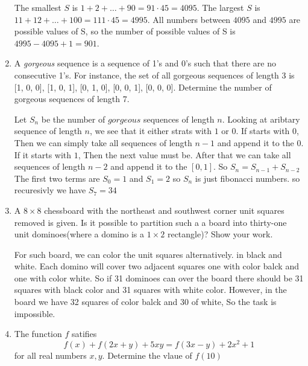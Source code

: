 \documentclass[a4paper]{article}
\theoremstyle{definition}
\begin{document}
\begin{enumerate}
\begin{tcolorbox}[width=\linewidth, sharp corners=all, colback=white!95!black]
    The smallest $S$ is $1+2+ \ldots +90 = 91 \cdot 45 = 4095$. The largest $S$
    is $11+12+ \ldots +100=111\cdot 45=4995$. All numbers between $4095$ and
    $4995$ are possible values of S, so the number of possible values of S is
    $4995-4095+1=901$.

\end{tcolorbox}




\item A \textit{gorgeous} sequence is a sequence of 1’s and 0’s such that there are no consecutive 1’s. For
instance, the set of all gorgeous sequences of length 3 is {[1, 0, 0], [1, 0, 1], [0, 1, 0], [0, 0, 1], [0, 0, 0]}.
Determine the number of gorgeous sequences of length 7.

\begin{tcolorbox}[width=\linewidth, sharp corners=all, colback=white!95!black]
    Let $S_n$ be the number of $gorgeous$ sequences of length $n$.
    Looking at aribtary sequence of length $n$, we see that
    it either strats with $1$ or $0$. If starts with $0$,
    Then we can simply take all sequences of length $n-1$ and
    append it to the $0$.
    If it starts with $1$, Then the next value must be. After
    that we can take all sequences of length $n-2$ and append it
    to the $[0, 1]$. So $S_n = S_{n-1} + S_{n-2}$
    The first two terms are $S_0 = 1$ and $S_1 = 2$
    so $S_n$ is just fibonacci numbers. so recuresivly we have
    $S_7 = 34$
\end{tcolorbox}
 \item A \(8 \times 8\) chessboard with the northeast and southwest corner unit squares removed is given. Is it
          possible to partition such a a board into thirty-one unit dominoes(where a domino is a \(1 \times 2\) rectangle)?
          Show your work.

\begin{tcolorbox}[width=\linewidth, sharp corners=all, colback=white!95!black]
    For such board, we can color the unit squares alternatively.
    in black and white.
    Each domino will cover two adjacent squares one with color
    balck and one with color white. So if 31 dominoes can over the board
    there should be 31 squares with black color and 31 squares with white color.
    However, in the board we have  32 squares of color balck
    and 30 of white, So the task is impossible.
\end{tcolorbox}
\item The function $f$ satifies
\[
    f(x) + f(2x+y) + 5xy = f(3x - y) + 2x^2 + 1
\]
for all real numbers $x, y$. Determine the vlaue of $f(10)$


\end{enumerate}
\end{document}
